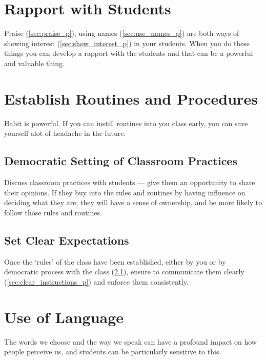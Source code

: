 \documentclass[12pt]{report}
\begin{document}
\section{Rapport with Students}
\label{sec:rapport_p}

Praise (\ref{sec:praise_p}), using names (\ref{sec:use_names_p}) are both ways of showing interest (\ref{sec:show_interest_p}) in your students. When you do these things you can develop a rapport with the students and that can be a powerful and valuable thing.



\section{Establish Routines and Procedures}
\label{sec:routines_p}

Habit is powerful. If you can instill routines into you class early, you can save yourself alot of headache in the future.

\subsection{Democratic Setting of Classroom Practices}
\label{sec:democratic_setting_of_routines_p}

Discuss classroom practices with students --- give them an opportunity to share their opinions. If they buy into the rules and routines by having influence on deciding what they are, they will have a sense of ownership, and be more likely to follow those rules and routines.

\subsection{Set Clear Expectations}
\label{sec:set_clear_expectations_p}

Once the `rules' of the class have been established, either by you or by democratic process with the class (\ref{sec:democratic_setting_of_routines_p}), ensure to communicate them clearly (\ref{sec:clear_instructions_p}) and enforce them consistently.



\section{Use of Language}
\label{sec:language_p}

The words we choose and the way we speak can have a profound impact on how people perceive us, and students can be particularly sensitive to this.
\end{document}
